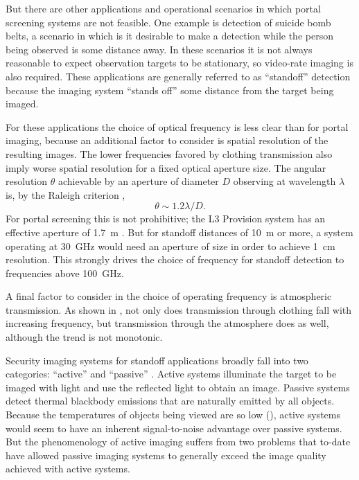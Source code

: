 But there are other applications and operational scenarios in which portal screening systems are not feasible.
One example is detection of suicide bomb belts, a scenario in which is it desirable to make a detection while the person being observed is some distance away.
In these scenarios it is not always reasonable to expect observation targets to be stationary, so video-rate imaging is also required.
These applications are generally referred to as ``standoff'' detection because the imaging system ``stands off'' some distance from the target being imaged.

For these applications the choice of optical frequency is less clear than for portal imaging, because an additional factor to consider is spatial resolution of the resulting images.
The lower frequencies favored by clothing transmission also imply worse spatial resolution for a fixed optical aperture size.
The angular resolution $\theta$ achievable by an aperture of diameter $D$ observing at wavelength $\lambda$ is, by the Raleigh criterion \cite{born_principles_1999},
\begin{equation} \label{eqn:ch1-raleigh}
  \theta \sim 1.2 \lambda / D.
\end{equation}
For portal screening this is not prohibitive; the L3 Provision system has an effective aperture of \SI{1.7}{\m} \cite{mcmakin_dual-surface_2009}.
But for standoff distances of \SI{10}{\m} or more, a system operating at \SI{30}{\GHz} would need an aperture of size  in order to achieve \SI{1}{\cm} resolution.
This strongly drives the choice of frequency for standoff detection to frequencies above \SI{100}{\GHz}.

A final factor to consider in the choice of operating frequency is atmospheric transmission.
As shown in , not only does transmission through clothing fall with increasing frequency, but transmission through the atmosphere does as well, although the trend is not monotonic.

Security imaging systems for standoff applications broadly fall into two categories: ``active'' and ``passive'' \cite{appleby_standoff_2007,appleby_passive_2004}.
Active systems illuminate the target to be imaged with light and use the reflected light to obtain an image.
Passive systems detect thermal blackbody emissions that are naturally emitted by all objects.
Because the temperatures of objects being viewed are so low (), active systems would seem to have an inherent signal-to-noise advantage over passive systems.
But the phenomenology of active imaging suffers from two problems that to-date have allowed passive imaging systems to generally exceed the image quality achieved with active systems.

